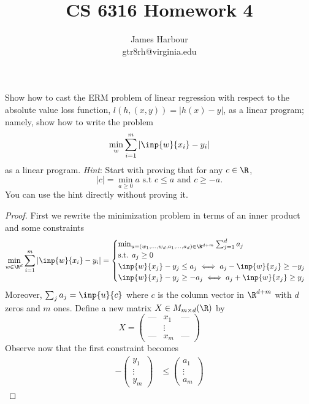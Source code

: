 \documentclass[12pt]{article}
\title{CS 6316 Homework 4}
\author{James Harbour\\gtr8rh@virginia.edu}
\begin{document}
\maketitle

\begin{homeworkProblem}
  Show how to cast the ERM problem of linear regression with respect to the absolute value loss function, $ l(h, (x,y)) = |h(x)-y| $, as a linear program; namely, show how to write the problem
  \[
    \min_{w}\sum_{i=1}^{m}|\inp{w}{x_{i}}-y_{i}|
  \]
  as a linear program. \textit{Hint}: Start with proving that for any $ c\in \R $,
  \[
    |c| = \min_{a\geq 0}a \text{ s.t } c\leq a \text{ and } c\geq -a.
  \]
  You can use the hint directly without proving it.
\end{homeworkProblem}

\begin{proof}
  First we rewrite the minimization problem in terms of an inner product and some constraints
  \begin{align*}
    \min_{w\in \R^{d}} \sum_{i=1}^{m}|\inp{w}{x_{i}} - y_{i}| = \begin{cases}\min_{u = (w_{1},\ldots,w_{d}, a_{1},\ldots,a_{d})\in \R^{d+m}} \sum_{j=1}^{d}a_{j}\\
      \text{s.t. }a_{j}\geq 0\\
      \inp{w}{x_{j}}-y_{j} \leq a_{j} \iff a_{j} -\inp{w}{x_{j}}\geq -y_{j}\\
      \inp{w}{x_{j}}-y_{j} \geq -a_{j} \iff a_{j} + \inp{w}{x_{j}} \geq y_{j}
    \end{cases}
  \end{align*}
  Moreover, $ \sum_{j}a_{j} =  \inp{u}{c} $ where $ c $  is the column vector in $ \R^{d+m} $ with $ d $ zeros and $ m $ ones.
  Define a new matrix $ X\in M_{m\times d}(\R) $ by 
  \[
    X = \begin{pmatrix}
          \text{---} & x_{1} & \text{---}\\
          & \vdots & \\ 
          \text{---} & x_{m} & \text{---}
        \end{pmatrix}
  \]
  Observe now that the first constraint becomes
  \begin{align*}
    -\begin{pmatrix}
      y_{1}\\\vdots\\ y_{m}
    \end{pmatrix}&\leq
    \begin{pmatrix}
      a_{1} \\\vdots\\ a_{m} 

\end{pmatrix}
\end{align*}
\end{proof}
\end{document}

